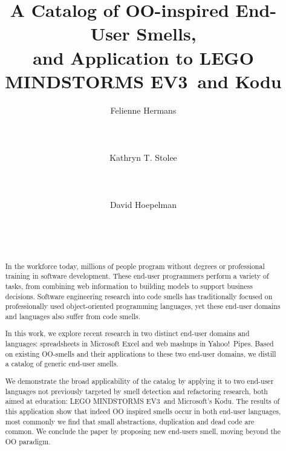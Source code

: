 \documentclass{sig-alternate}
\newcommand{\ms}{LEGO MINDSTORMS EV3}
\begin{document}
%
\title{A Catalog of OO-inspired End-User Smells, \\and Application to \ms~and Kodu}

\author{
\alignauthor
Felienne Hermans\\
       \\
       \\
       \\
\alignauthor
Kathryn T. Stolee\\
       \\
       \\
       \\
\alignauthor
David Hoepelman\\
       \\
       \\
       \\
}

\maketitle


\begin{abstract}
In the workforce today, millions of people program without degrees or professional training in software development. 
These end-user programmers perform a variety of tasks, from combining web information to building models to support business decisions. Software engineering research into code smells has traditionally focused on professionally used object-oriented programming languages, yet these end-user domains and languages also suffer from code smells. 

In this work, we explore recent research in two distinct end-user domains and languages: spreadsheets in Microsoft Excel and web mashups in Yahoo!\ Pipes. Based on existing OO-smells and their applications to these two end-user domains, we distill a catalog of generic end-user smells. 

We demonstrate the broad applicability of the catalog by applying it to two end-user languages not previously targeted by smell detection and refactoring research, both aimed at education: \ms~and Microsoft's Kodu. The results of this application show that indeed OO inspired smells occur in both end-user languages, most commonly we find that small abstractions, duplication and dead code are common. We conclude the paper by proposing new end-users smell, moving beyond the OO paradigm. 
\end{abstract}
\end{document}
